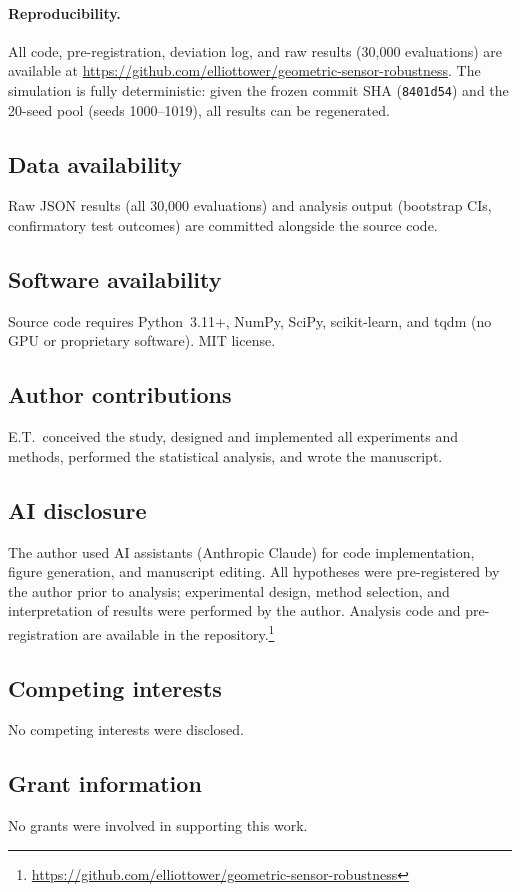 \documentclass[11pt]{article}
\begin{document}
\paragraph{Reproducibility.}
All code, pre-registration, deviation log, and raw results (30,000
evaluations) are available at
\url{https://github.com/elliottower/geometric-sensor-robustness}.
The simulation is fully deterministic: given the frozen commit SHA
(\texttt{8401d54}) and the 20-seed pool (seeds 1000--1019), all results
can be regenerated.

\subsection*{Data availability}

Raw JSON results (all 30,000 evaluations) and analysis output
(bootstrap CIs, confirmatory test outcomes) are committed alongside
the source code.

\subsection*{Software availability}

Source code requires Python~3.11+, NumPy, SciPy, scikit-learn, and
tqdm (no GPU or proprietary software).  MIT license.

\subsection*{Author contributions}

E.T.\ conceived the study, designed and implemented all experiments and
methods, performed the statistical analysis, and wrote the manuscript.

\subsection*{AI disclosure}

The author used AI assistants (Anthropic Claude) for code implementation,
figure generation, and manuscript editing.  All hypotheses were
pre-registered by the author prior to analysis; experimental design,
method selection, and interpretation of results were performed by the
author.  Analysis code and pre-registration are available in the
repository.\footnote{\url{https://github.com/elliottower/geometric-sensor-robustness}}

\subsection*{Competing interests}

No competing interests were disclosed.

\subsection*{Grant information}

No grants were involved in supporting this work.



\end{document}
